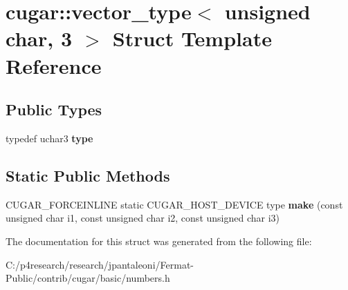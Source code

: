 \hypertarget{structcugar_1_1vector__type_3_01unsigned_01char_00_013_01_4}{}\section{cugar\+:\+:vector\+\_\+type$<$ unsigned char, 3 $>$ Struct Template Reference}
\label{structcugar_1_1vector__type_3_01unsigned_01char_00_013_01_4}
\subsection*{Public Types}
\begin{DoxyCompactItemize}
\item 
\mbox{\label{structcugar_1_1vector__type_3_01unsigned_01char_00_013_01_4_a60bd87eb9faf29693c6fb74f16b63561}} 
typedef uchar3 {\bfseries type}
\end{DoxyCompactItemize}
\subsection*{Static Public Methods}
\begin{DoxyCompactItemize}
\item 
\mbox{\label{structcugar_1_1vector__type_3_01unsigned_01char_00_013_01_4_a2753aa9bd3a64be87d681731c4dbcf48}} 
C\+U\+G\+A\+R\+\_\+\+F\+O\+R\+C\+E\+I\+N\+L\+I\+NE static C\+U\+G\+A\+R\+\_\+\+H\+O\+S\+T\+\_\+\+D\+E\+V\+I\+CE type {\bfseries make} (const unsigned char i1, const unsigned char i2, const unsigned char i3)
\end{DoxyCompactItemize}


The documentation for this struct was generated from the following file\+:\begin{DoxyCompactItemize}
\item 
C\+:/p4research/research/jpantaleoni/\+Fermat-\/\+Public/contrib/cugar/basic/numbers.\+h\end{DoxyCompactItemize}
